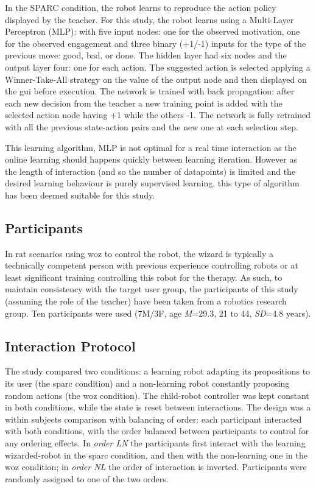 In the SPARC condition, the robot learns to reproduce the action policy displayed by the teacher. For this study, the robot learns using a Multi-Layer Perceptron (MLP): with five input nodes: one for the observed motivation, one for the observed engagement and three binary (+1/-1) inputs for the type of the previous move: good, bad, or done. The hidden layer had six nodes and the output layer four: one for each action. The suggested action is selected applying a Winner-Take-All strategy on the value of the output node and then displayed on the \gls{gui} before execution. The network is trained with back propagation: after each new decision from the teacher a new training point is added with the selected action node having +1 while the others -1. The network is fully retrained with all the previous state-action pairs and the new one at each selection step. 

This learning algorithm, MLP is not optimal for a real time interaction as the online learning should happens quickly between learning iteration. However as the length of interaction (and so the number of datapoints) is limited and the desired learning behaviour is purely supervised learning, this type of algorithm has been deemed suitable for this study.

\subsection{Participants}

In \gls{rat} scenarios using \gls{woz} to control the robot, the wizard is typically a technically competent person with previous experience controlling robots or at least significant training controlling this robot for the therapy. As such, to maintain consistency with the target user group, the participants of this study (assuming the role of the teacher) have been taken from a robotics research group. Ten participants were used (7M/3F, age \textit{M}=29.3, 21 to 44, \textit{SD}=4.8 years).

\subsection{Interaction Protocol}

The study compared two conditions: a learning robot adapting its propositions to its user (the \gls{sparc} condition) and a non-learning robot constantly proposing random actions (the \gls{woz} condition). The child-robot controller was kept constant in both conditions, while the state is reset between interactions. The design was a within subjects comparison with balancing of order: each participant interacted with both conditions, with the order balanced between participants to control for any ordering effects. In \textit{order LN} the participants first interact with the learning wizarded-robot in the \gls{sparc} condition, and then with the non-learning one in the \gls{woz} condition; in \textit{order NL} the order of interaction is inverted. Participants were randomly assigned to one of the two orders.

